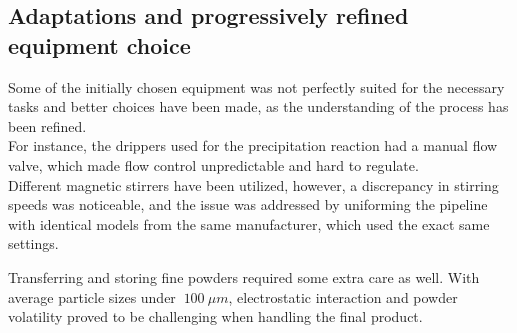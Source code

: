 \documentclass{article}
\begin{document}
        \subsection{Adaptations and progressively refined equipment choice\label{faulty_equipment}}

        Some of the initially chosen equipment was not perfectly suited for the necessary tasks and better choices have been made, as the 
        understanding of the process has been refined. \\ 

        For instance, the drippers used for the precipitation reaction had a manual flow valve, which made flow control unpredictable 
        and hard to regulate. \\ 

%

        Different magnetic stirrers have been utilized, however, a discrepancy 
        in stirring speeds was noticeable, and the issue was addressed by uniforming the pipeline with identical models from the same manufacturer, 
        which used the exact same settings. 


%

        Transferring and storing fine powders required some extra care as well. With average particle sizes under $ \ 100 \ \mu m$, 
        electrostatic interaction and powder volatility proved to be challenging when handling the final product. 
        
\end{document}
